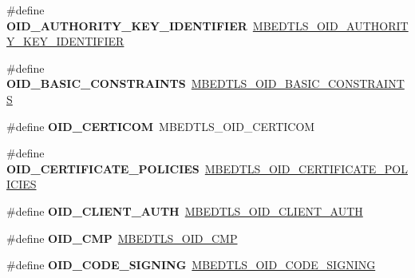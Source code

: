 \begin{DoxyCompactItemize}
\item 
\mbox{\label{compat-1_83_8h_a112e31f84dbab67d2a9d7091628cbf08}} 
\#define {\bfseries O\+I\+D\+\_\+\+A\+U\+T\+H\+O\+R\+I\+T\+Y\+\_\+\+K\+E\+Y\+\_\+\+I\+D\+E\+N\+T\+I\+F\+I\+ER}~\mbox{\hyperlink{oid_8h_a8db3ad616aaec9dd351e76d7b8618c58}{M\+B\+E\+D\+T\+L\+S\+\_\+\+O\+I\+D\+\_\+\+A\+U\+T\+H\+O\+R\+I\+T\+Y\+\_\+\+K\+E\+Y\+\_\+\+I\+D\+E\+N\+T\+I\+F\+I\+ER}}
\item 
\mbox{\label{compat-1_83_8h_af3baf30a7e2dfa2df217ddda99491181}} 
\#define {\bfseries O\+I\+D\+\_\+\+B\+A\+S\+I\+C\+\_\+\+C\+O\+N\+S\+T\+R\+A\+I\+N\+TS}~\mbox{\hyperlink{oid_8h_a5f878af0c9f3f73986f982aa15f5d580}{M\+B\+E\+D\+T\+L\+S\+\_\+\+O\+I\+D\+\_\+\+B\+A\+S\+I\+C\+\_\+\+C\+O\+N\+S\+T\+R\+A\+I\+N\+TS}}
\item 
\mbox{\label{compat-1_83_8h_a8cc3987d4d538c96d20b21bb2d486848}} 
\#define {\bfseries O\+I\+D\+\_\+\+C\+E\+R\+T\+I\+C\+OM}~M\+B\+E\+D\+T\+L\+S\+\_\+\+O\+I\+D\+\_\+\+C\+E\+R\+T\+I\+C\+OM
\item 
\mbox{\label{compat-1_83_8h_a0ade15f9c58cac567bb3b743d054f806}} 
\#define {\bfseries O\+I\+D\+\_\+\+C\+E\+R\+T\+I\+F\+I\+C\+A\+T\+E\+\_\+\+P\+O\+L\+I\+C\+I\+ES}~\mbox{\hyperlink{oid_8h_ae89ed083c9b13940b5d940b9e70d1d17}{M\+B\+E\+D\+T\+L\+S\+\_\+\+O\+I\+D\+\_\+\+C\+E\+R\+T\+I\+F\+I\+C\+A\+T\+E\+\_\+\+P\+O\+L\+I\+C\+I\+ES}}
\item 
\mbox{\label{compat-1_83_8h_acdd518c3b1e387b3add1dd3ea038fb6f}} 
\#define {\bfseries O\+I\+D\+\_\+\+C\+L\+I\+E\+N\+T\+\_\+\+A\+U\+TH}~\mbox{\hyperlink{oid_8h_a4844194884542843ed41c02344bcd2f0}{M\+B\+E\+D\+T\+L\+S\+\_\+\+O\+I\+D\+\_\+\+C\+L\+I\+E\+N\+T\+\_\+\+A\+U\+TH}}
\item 
\mbox{\label{compat-1_83_8h_aff9825d8ae1f50a45f84fd762b43a5e2}} 
\#define {\bfseries O\+I\+D\+\_\+\+C\+MP}~\mbox{\hyperlink{asn1_8h_a0b81f225b3551ec7c4da69b2d183d10b}{M\+B\+E\+D\+T\+L\+S\+\_\+\+O\+I\+D\+\_\+\+C\+MP}}
\item 
\mbox{\label{compat-1_83_8h_ae9dee7f4c77075347830faabe9255b16}} 
\#define {\bfseries O\+I\+D\+\_\+\+C\+O\+D\+E\+\_\+\+S\+I\+G\+N\+I\+NG}~\mbox{\hyperlink{oid_8h_a009e8dcda015bc2320261a1faf6e066a}{M\+B\+E\+D\+T\+L\+S\+\_\+\+O\+I\+D\+\_\+\+C\+O\+D\+E\+\_\+\+S\+I\+G\+N\+I\+NG}}

\end{DoxyCompactItemize}
